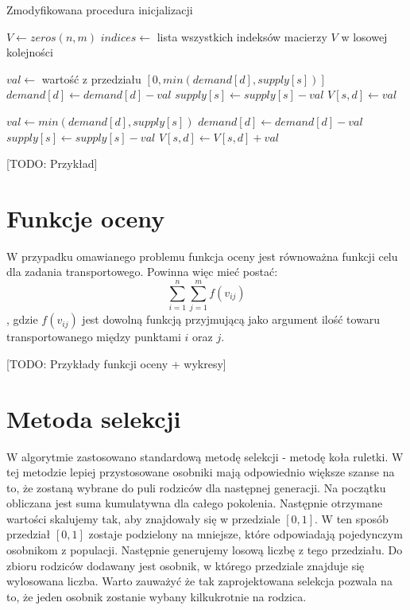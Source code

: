 \begin{pseudokod}
    \caption{Zmodyfikowana procedura inicjalizacji}
    $V \gets zeros(n, m)$
    $indices \gets$ lista wszystkich indeksów macierzy $V$ w losowej kolejności\;
    
     {
        $val \gets$ wartość z przedziału $[0, min(demand[d], supply[s])]$\;
        $demand[d] \gets demand[d] - val$\;
        $supply[s] \gets supply[s] - val$\;
        $V[s, d] \gets val$\;
    }

     {
        $val \gets min(demand[d], supply[s])$\;
        $demand[d] \gets demand[d] - val$\;
        $supply[s] \gets supply[s] - val$\;
        $V[s, d] \gets V[s, d] + val$\;
    }

\end{pseudokod}

[TODO: Przykład]

\section{Funkcje oceny}
W przypadku omawianego problemu funkcja oceny jest równoważna funkcji celu dla zadania transportowego. Powinna więc mieć postać:
$$\sum_{i=1}^{n}\sum_{j=1}^{m} f(v_{ij})$$, 
gdzie $f(v_{ij})$ jest dowolną funkcją przyjmującą jako argument ilość towaru transportowanego między punktami $i$ oraz $j$.

[TODO: Przykłady funkcji oceny + wykresy]

\section{Metoda selekcji}
W algorytmie zastosowano standardową metodę selekcji - metodę koła ruletki. W tej metodzie lepiej przystosowane osobniki mają odpowiednio większe 
szanse na to, że zostaną wybrane do puli rodziców dla następnej generacji. Na początku obliczana jest suma kumulatywna dla całego pokolenia. Następnie 
otrzymane wartości skalujemy tak, aby znajdowały się w przedziale $[0, 1]$. W ten sposób przedział $[0, 1]$ zostaje podzielony na mniejsze, które 
odpowiadają pojedynczym osobnikom z populacji. Następnie generujemy losową liczbę z tego przedziału. Do zbioru rodziców dodawany jest osobnik, 
w którego przedziale znajduje się wylosowana liczba. Warto zauważyć że tak zaprojektowana selekcja pozwala na to, że jeden osobnik zostanie wybany 
kilkukrotnie na rodzica.

